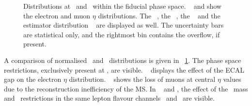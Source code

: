\begin{figure}[tbp!]
{  \label{sfig:recotruemet}
}
\hfill
{}
%
\caption[Distributions at \truel\ and \recolevel]{
%
Distributions at \truel\ and \recolevel\ within the fiducial phase space. 
%
~ and  show the electron and muon $\eta$ distributions. 
%
The \mll~, the \met~, the \ptlb~ and the estimator distribution \mlb~ are displayed as well.
%
The uncertainty bars are statistical only, and the rightmost bin contains the overflow, if present.
%
\label{fig:evselrecotrue}
}
\end{figure}
%
A comparison of normalised \truel\ and \recolevel\ distributions is given in \fig~\ref{fig:evselrecotrue}. 
%
The phase space restrictions, exclusively present at \recolevel, are visible. 
%
\Fig~ displays the effect of the \gls{ECAL} gap on the electron $\eta$ distribution.
%
\Fig~ shows the loss of muons at central $\eta$ values due to the reconstruction inefficiency of the \gls{MS}.
%
In ~ and , the effect of the \Zboson\ mass and \met\ restrictions in the same lepton flavour channels \ee\ and \mumu\ are visible.
